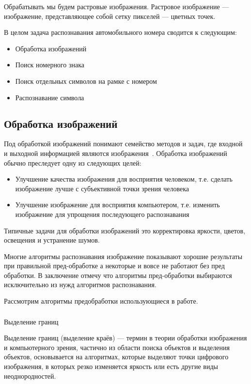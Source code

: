 Обрабатывать мы будем растровые изображения. Растровое изображение — изображение, представляющее собой сетку пикселей — цветных точек.

В целом задача распознавания автомобильного номера сводится к следующим: 
\begin{itemize}
  \item Обработка изображений
  \item Поиск номерного знака
  \item Поиск отдельных символов на рамке с номером
  \item Распознавание символа
\end{itemize}

\subsection{Обработка изображений}
\label{sub:domain:image_processing}

Под обработкой  изображений понимают семейство  методов  и  задач,  где  входной  и  выходной информацией  являются  изображения~\cite{misoi_clides}. Обработка изображений обычно преследует одну из следующих целей:
\begin{itemize}
  \item Улучшение качества изображения для восприятия человеком, т.е. сделать изображение лучше с субъективной точки зрения человека
  \item Улучшение изображение для восприятия компьютером, т.е. изменить изображение для упрощения последующего распознавания
\end{itemize}
Типичные задачи для обработки изображений это корректировка яркости, цветов, освещения и устранение шумов. 

Многие алгоритмы распознавания изображение показывают хорошие результаты при правильной пред-обработке а некоторые и вовсе не работают без пред обработки. В заключение отмечу что алгоритмы пред-обработки выбираются исключительно из нужд алгоритмов распознавания.

Рассмотрим алгоритмы предобработки использующиеся в работе.

\subsubsection{}
\label{sub:domain:image_processing:edges_detection}
Выделение границ

Выделение границ (выделение краёв) — термин в теории обработки изображения и компьютерного зрения, частично из области поиска объектов и выделения объектов, основывается на алгоритмах, которые выделяют точки цифрового изображения, в которых резко изменяется яркость или есть другие виды неоднородностей.

